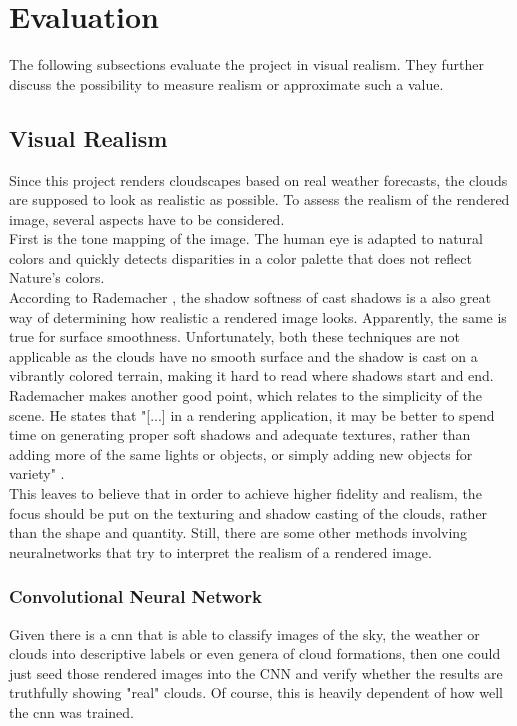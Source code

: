 \section{Evaluation}
The following subsections evaluate the project in visual realism. They further discuss the possibility to measure realism or approximate such a value.

\subsection{Visual Realism}
\label{section:techimpl:measure}
Since this project renders cloudscapes based on real weather forecasts, the clouds are supposed to look as realistic as possible.
To assess the realism of the rendered image, several aspects have to be considered.
\\
First is the tone mapping of the image. The human eye is adapted to natural colors and quickly detects disparities in a color palette that does not reflect Nature's colors.
\\
According to Rademacher \cite{diglib:realism}, the shadow softness of cast shadows is a also great way of determining how realistic a rendered image looks.
Apparently, the same is true for surface smoothness.
Unfortunately, both these techniques are not applicable as the clouds have no smooth surface and the shadow is cast on a vibrantly colored terrain, making it hard to read where shadows start and end.
\\
Rademacher makes another good point, which relates to the simplicity of the scene.
He states that "[...] in a rendering application, it may be better to spend time on generating proper soft shadows and adequate textures, rather than adding more of the same lights
or objects, or simply adding new objects for variety" \cite{diglib:realism2}.
\\
This leaves to believe that in order to achieve higher fidelity and realism, the focus should be put on the texturing and shadow casting of the clouds, rather than the shape and quantity.
\emptyline
Still, there are some other methods involving \gls{neuralnetwork}s that try to interpret the realism of a rendered image.

\subsubsection{Convolutional Neural Network}
Given there is a \gls{cnn} that is able to classify images of the sky, the weather or clouds into descriptive labels or even genera of cloud formations, then one could just seed those rendered images into the CNN and verify whether the results are truthfully showing "real" clouds.
Of course, this is heavily dependent of how well the \gls{cnn} was trained.

